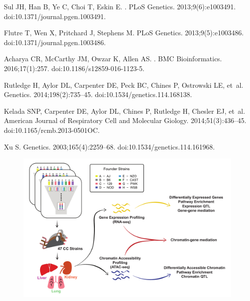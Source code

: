 \documentclass[10pt,letterpaper]{article}
\begin{document}
\begin{thebibliography}{10}
Sul JH, Han B, Ye C, Choi T, Eskin E.
.
\newblock PLoS Genetics. 2013;9(6):e1003491.
\newblock doi:{10.1371/journal.pgen.1003491}.

Flutre T, Wen X, Pritchard J, Stephens M.
\newblock PLoS Genetics. 2013;9(5):e1003486.
\newblock doi:{10.1371/journal.pgen.1003486}.

Acharya CR, McCarthy JM, Owzar K, Allen AS.
.
\newblock BMC Bioinformatics. 2016;17(1):257.
\newblock doi:{10.1186/s12859-016-1123-5}.

Rutledge H, Aylor DL, Carpenter DE, Peck BC, Chines P, Ostrowski LE, et~al.
\newblock Genetics. 2014;198(2):735--45.
\newblock doi:{10.1534/genetics.114.168138}.

Kelada SNP, Carpenter DE, Aylor DL, Chines P, Rutledge H, Chesler EJ, et~al.
\newblock American Journal of Respiratory Cell and Molecular Giology.
  2014;51(3):436--45.
\newblock doi:{10.1165/rcmb.2013-0501OC}.

Xu S.
\newblock Genetics. 2003;165(4):2259--68.
\newblock doi:{10.1534/genetics.114.161968}.

\end{thebibliography}

\newpage

\setcounter{table}{0}
\setcounter{figure}{0}


\begin{figure}[hp]
\includegraphics[width=\linewidth, clip, trim={0in 0.1in 0in 0.2in}]{figs/overview_diagram_simplified.pdf}
\caption{}
\end{figure}
\end{document}
